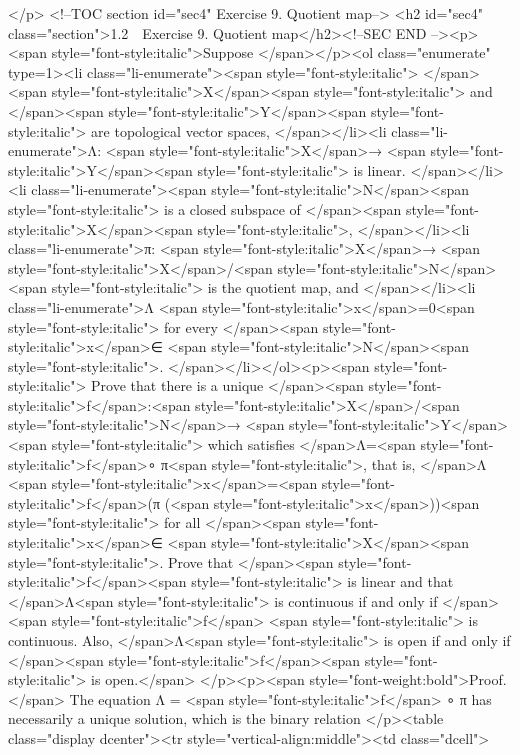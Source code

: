 {{{{</p>
<!--TOC section id="sec4" Exercise 9. Quotient map-->
<h2 id="sec4" class="section">1.2  Exercise 9. Quotient map</h2><!--SEC END --><p>
<span style="font-style:italic">Suppose
</span></p><ol class="enumerate" type=1><li class="li-enumerate"><span style="font-style:italic">
</span><span style="font-style:italic">X</span><span style="font-style:italic"> and </span><span style="font-style:italic">Y</span><span style="font-style:italic"> are topological vector spaces,
</span></li><li class="li-enumerate">Λ: <span style="font-style:italic">X</span>→ <span style="font-style:italic">Y</span><span style="font-style:italic"> is linear.
</span></li><li class="li-enumerate"><span style="font-style:italic">N</span><span style="font-style:italic"> is a closed subspace of </span><span style="font-style:italic">X</span><span style="font-style:italic">,
</span></li><li class="li-enumerate">π: <span style="font-style:italic">X</span>→ <span style="font-style:italic">X</span>/<span style="font-style:italic">N</span><span style="font-style:italic"> is the quotient map, and
</span></li><li class="li-enumerate">Λ <span style="font-style:italic">x</span>=0<span style="font-style:italic"> for every </span><span style="font-style:italic">x</span>∈ <span style="font-style:italic">N</span><span style="font-style:italic">.
</span></li></ol><p><span style="font-style:italic">
Prove that there is a unique </span><span style="font-style:italic">f</span>:<span style="font-style:italic">X</span>/<span style="font-style:italic">N</span>→ <span style="font-style:italic">Y</span><span style="font-style:italic"> which satisfies 
</span>Λ=<span style="font-style:italic">f</span>∘ π<span style="font-style:italic">, 
that is, 
</span>Λ <span style="font-style:italic">x</span>=<span style="font-style:italic">f</span>(π (<span style="font-style:italic">x</span>))<span style="font-style:italic"> for all </span><span style="font-style:italic">x</span>∈ <span style="font-style:italic">X</span><span style="font-style:italic">. 
Prove that </span><span style="font-style:italic">f</span><span style="font-style:italic"> is linear and that </span>Λ<span style="font-style:italic"> is continuous if and only if 
</span><span style="font-style:italic">f</span> <span style="font-style:italic"> is continuous. 
Also, </span>Λ<span style="font-style:italic"> is open if and only if </span><span style="font-style:italic">f</span><span style="font-style:italic"> is open.</span>
</p><p><span style="font-weight:bold">Proof.</span>
The equation Λ = <span style="font-style:italic">f</span> ∘ π has necessarily a unique solution, 
which is the binary relation 
</p><table class="display dcenter"><tr style="vertical-align:middle"><td class="dcell">
     

}}}}
